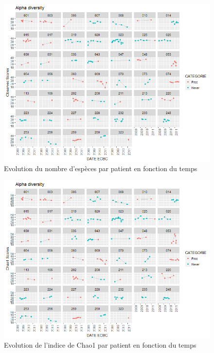 \documentclass[12pt,a4paper]{article}
\begin{document}
\begin{figure}
\begin{center}
\includegraphics[scale=0.80]{img/alpha_observed.png}\hfill
\end{center}
\caption{Evolution du nombre d'espèces par patient en fonction du temps}
\label{alphaObs}
\end{figure}


\begin{figure}
\begin{center}
\includegraphics[scale=0.80]{img/alpha_chao1.png}\hfill
\end{center}
\caption{Evolution de l'indice de Chao1 par patient en fonction du temps}
\label{alphaChao1}
\end{figure}
\end{document}
